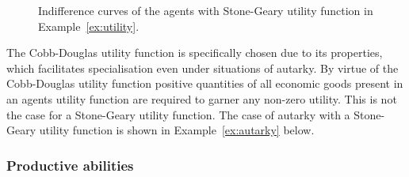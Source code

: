 \begin{figure}[t]
\label{fig:utility}
\begin{center}
\end{center}
\caption[Indifference curves of the agents with Stone-Geary utility function]{Indifference curves of the agents with Stone-Geary utility function in Example~\ref{ex:utility}.}
\end{figure}
The Cobb-Douglas utility function is specifically chosen due to its properties, which facilitates specialisation even under situations of autarky. By virtue of the Cobb-Douglas utility function positive quantities of all economic goods present in an agents utility function are required to garner any non-zero utility. This is not the case for a Stone-Geary utility function. The case of autarky with a Stone-Geary utility function is shown in Example~\ref{ex:autarky} below.

\subsubsection{Productive abilities}

